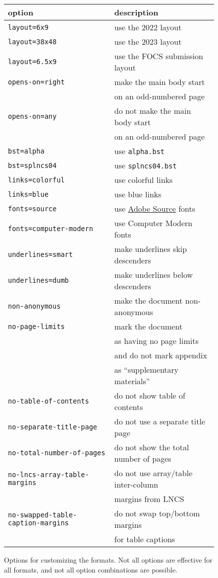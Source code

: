 \begin{figure}
\centering
\capstart
\begin{tabular}{ll}
\toprule
\textbf{option} & \textbf{description} \\
\midrule
\texttt{layout=6x9} & use the 2022 layout \\
\texttt{layout=38x48} & use the 2023 layout \\
\texttt{layout=6.5x9} & use the FOCS submission layout \\
\texttt{opens-on=right} & make the main body start \\
& \qquad on an odd-numbered page \\
\texttt{opens-on=any} & do not make the main body start \\
& \qquad on an odd-numbered page \\
\texttt{bst=alpha} & use \texttt{alpha.bst} \\
\texttt{bst=splncs04} & use \texttt{splncs04.bst} \\
\texttt{links=colorful} & use colorful links \\
\texttt{links=blue} & use blue links \\
\texttt{fonts=source} &
use \href{https://github.com/adobe-fonts}{Adobe Source} fonts \\
\texttt{fonts=computer-modern} & use Computer Modern fonts \\
\texttt{underlines=smart} & make underlines skip descenders \\
\texttt{underlines=dumb} & make underlines below descenders \\
\texttt{non-anonymous} & make the document non-anonymous \\
\texttt{no-page-limits} & mark the document \\
& \qquad as having no page limits \\
& \quad and do not mark appendix \\
& \qquad as ``supplementary materials'' \\
\texttt{no-table-of-contents} & do not show table of contents \\
\texttt{no-separate-title-page} & do not use a separate title page \\
\texttt{no-total-number-of-pages} & do not show the total number of pages \\
\texttt{no-lncs-array-table-margins} & do not use array/table inter-column \\
& \qquad margins from LNCS \\
\texttt{no-swapped-table-caption-margins} &
do not swap top/bottom margins \\
& \qquad for table captions \\
\bottomrule
\end{tabular}
\caption{Options for customizing the formats.
Not all options are effective for all formats, and
not all option combinations are possible.}
\label{fig:figure1}
\end{figure}

